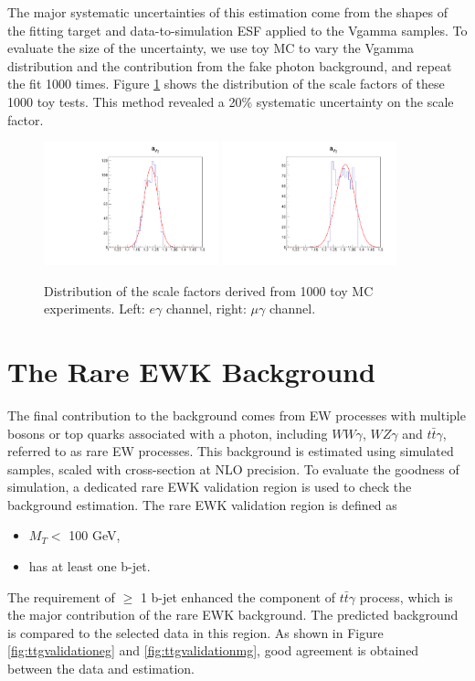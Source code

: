 \documentclass[thesis.tex]{subfiles}
\renewcommand\_{\textunderscore\allowbreak}
\begin{document}
The major systematic uncertainties of this estimation come from the shapes of the fitting target and data-to-simulation ESF applied to the Vgamma samples. To evaluate the size of the uncertainty, we use toy MC to vary the Vgamma distribution and the contribution from the fake photon background, and 
repeat the fit 1000 times. Figure \ref{fig:dphisystematic} shows the distribution of the scale factors of these 1000 toy tests. This method revealed a 20\% systematic uncertainty on the scale factor.

\begin{figure}[hbtp]
  \centering
    \includegraphics[width=0.45\textwidth]{Figures/VGammaScale_eg.pdf}
    \includegraphics[width=0.45\textwidth]{Figures/VGammaScale_mg.pdf}
  \caption{Distribution of the scale factors derived from 1000 toy MC experiments. Left: $e\gamma$ channel, right: $\mu\gamma$ channel.}
    \label{fig:dphisystematic}
\end{figure}

\section{The Rare EWK Background}
The final contribution to the background comes from EW processes with multiple bosons or top quarks associated with a photon, including $WW\gamma$, $WZ\gamma$ and $t\bar{t}\gamma$, referred to as rare EW processes. 
This background is estimated using simulated samples, scaled with cross-section at NLO precision.
To evaluate the goodness of simulation, a dedicated rare EWK validation region is used to check the background estimation.
The rare EWK validation region is defined as
	\begin{itemize}
		\item $M_T <$ 100 GeV,
		\item has at least one b-jet.
	\end{itemize}
The requirement of $\ge$ 1 b-jet enhanced the component of $t\bar{t}\gamma$ process, which is the major contribution of the rare EWK background.
The predicted background is compared to the selected data in this region.
As shown in Figure \ref{fig:ttgvalidationeg} and \ref{fig:ttgvalidationmg}, good agreement is obtained between the data and estimation.
\end{document}
